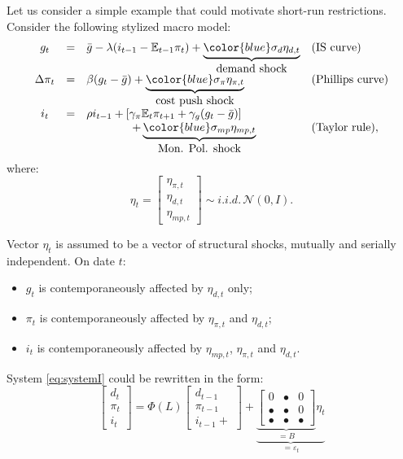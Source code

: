 \documentclass[
  12pt,
]{book}
\providecommand{\tightlist}{%
  \setlength{\itemsep}{0pt}\setlength{\parskip}{0pt}}
\theoremstyle{definition}
\theoremstyle{definition}
\theoremstyle{definition}
\theoremstyle{definition}
\theoremstyle{remark}
\begin{document}
Let us consider a simple example that could motivate short-run restrictions. Consider the following stylized macro model:
\begin{equation}
\begin{array}{clll}
g_{t}&=& \bar{g}-\lambda(i_{t-1}-\mathbb{E}_{t-1}\pi_{t})+ \underbrace{{\color{blue}\sigma_d \eta_{d,t}}}_{\mbox{demand shock}}& (\mbox{IS curve})\\
\Delta \pi_{t} & = & \beta (g_{t} - \bar{g})+ \underbrace{{\color{blue}\sigma_{\pi} \eta_{\pi,t}}}_{\mbox{cost push shock}} & (\mbox{Phillips curve})\\
i_{t} & = & \rho i_{t-1} + \left[ \gamma_\pi \mathbb{E}_{t}\pi_{t+1}  + \gamma_g (g_{t} - \bar{g}) \right]\\
&& \qquad \qquad+\underbrace{{\color{blue}\sigma_{mp} \eta_{mp,t}}}_{\mbox{Mon. Pol. shock}} & (\mbox{Taylor rule}),
\end{array}\label{eq:systemI}
\end{equation}
where:
\begin{equation}
\eta_t = 
\left[
\begin{array}{c}
\eta_{\pi,t}\\
\eta_{d,t}\\
\eta_{mp,t}
\end{array}
\right]
\sim i.i.d.\,\mathcal{N}(0,I).\label{eq:covU}
\end{equation}

Vector \(\eta_t\) is assumed to be a vector of structural shocks, mutually and serially independent. On date \(t\):

\begin{itemize}
\tightlist
\item
  \(g_t\) is contemporaneously affected by \(\eta_{d,t}\) only;
\item
  \(\pi_t\) is contemporaneously affected by \(\eta_{\pi,t}\) and \(\eta_{d,t}\);
\item
  \(i_t\) is contemporaneously affected by \(\eta_{mp,t}\), \(\eta_{\pi,t}\) and \(\eta_{d,t}\).
\end{itemize}

System \eqref{eq:systemI} could be rewritten in the form:
\begin{equation}
\left[\begin{array}{c}
d_t\\
\pi_t\\
i_t
\end{array}\right]
= \Phi(L)
\left[\begin{array}{c}
d_{t-1}\\
\pi_{t-1}\\
i_{t-1} +
\end{array}\right] +\underbrace{\underbrace{
\left[
\begin{array}{ccc}
0 & \bullet & 0 \\
\bullet & \bullet & 0 \\
\bullet & \bullet & \bullet
\end{array}
\right]}_{=B} \eta_t}_{=\varepsilon_t}\label{eq:BBBB}
\end{equation}
\end{document}
